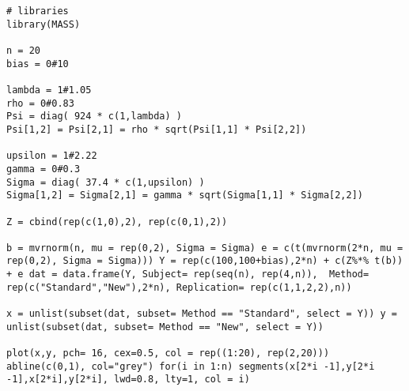 \documentclass[a4paper,12pt]{article}
\begin{document}
\begin{framed}
\begin{verbatim}
# libraries
library(MASS)

n = 20
bias = 0#10

lambda = 1#1.05
rho = 0#0.83
Psi = diag( 924 * c(1,lambda) )
Psi[1,2] = Psi[2,1] = rho * sqrt(Psi[1,1] * Psi[2,2])

upsilon = 1#2.22
gamma = 0#0.3
Sigma = diag( 37.4 * c(1,upsilon) )
Sigma[1,2] = Sigma[2,1] = gamma * sqrt(Sigma[1,1] * Sigma[2,2])

Z = cbind(rep(c(1,0),2), rep(c(0,1),2))

b = mvrnorm(n, mu = rep(0,2), Sigma = Sigma) e = c(t(mvrnorm(2*n, mu = rep(0,2), Sigma = Sigma))) Y = rep(c(100,100+bias),2*n) + c(Z%*% t(b)) + e dat = data.frame(Y, Subject= rep(seq(n), rep(4,n)),  Method= rep(c("Standard","New"),2*n), Replication= rep(c(1,1,2,2),n))

x = unlist(subset(dat, subset= Method == "Standard", select = Y)) y = unlist(subset(dat, subset= Method == "New", select = Y))

plot(x,y, pch= 16, cex=0.5, col = rep((1:20), rep(2,20))) abline(c(0,1), col="grey") for(i in 1:n) segments(x[2*i -1],y[2*i -1],x[2*i],y[2*i], lwd=0.8, lty=1, col = i)

\end{verbatim}
\end{framed}
\end{document}
